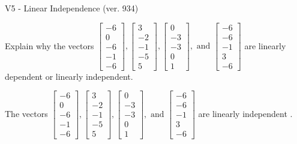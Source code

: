 \begin{exercise}
  \begin{exerciseTitle}V5 - Linear Independence (ver. 934)\end{exerciseTitle}
  \begin{exerciseStatement}
    Explain why the vectors \(\left[\begin{array}{r}
-6 \\
0 \\
-6 \\
-1 \\
-6
\end{array}\right] , \left[\begin{array}{r}
3 \\
-2 \\
-1 \\
-5 \\
5
\end{array}\right] , \left[\begin{array}{r}
0 \\
-3 \\
-3 \\
0 \\
1
\end{array}\right] , \text{ and } \left[\begin{array}{r}
-6 \\
-6 \\
-1 \\
3 \\
-6
\end{array}\right]\) are linearly dependent or linearly independent.	


  \end{exerciseStatement}
  \begin{exerciseAnswer}
   The vectors \(\left[\begin{array}{r}
-6 \\
0 \\
-6 \\
-1 \\
-6
\end{array}\right] , \left[\begin{array}{r}
3 \\
-2 \\
-1 \\
-5 \\
5
\end{array}\right] , \left[\begin{array}{r}
0 \\
-3 \\
-3 \\
0 \\
1
\end{array}\right] , \text{ and } \left[\begin{array}{r}
-6 \\
-6 \\
-1 \\
3 \\
-6
\end{array}\right]\) are 
  	 linearly independent  .
  


  \end{exerciseAnswer}
\end{exercise}